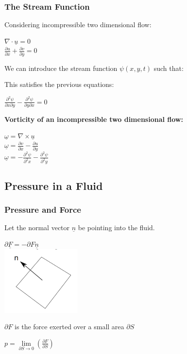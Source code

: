 \subsubsection{The Stream Function}
Considering incompressible two dimensional flow:
\begin{center}
	$\nabla \cdot \underline{u} = 0$
	\\
	$\frac{\partial u}{\partial x} + \frac{\partial v}{\partial y} = 0$	
\end{center}
We can introduce the stream function $\psi (x,y,t)$ such that:
\begin{center}
\end{center}
This satisfies the previous equations:
\begin{center}
	$\frac{\partial^2 \psi}{\partial x \partial y} - \frac{\partial^2 \psi}{\partial y \partial x} = 0$
\end{center}
\textbf{Vorticity of an incompressible two dimensional flow:}
\begin{center}
	$\underline{\omega} = \nabla \times \underline{u}$
	\\
	$\underline{\omega} = \frac{\partial v}{\partial x} - \frac{\partial u}{\partial y}$
	\\
	$\underline{\omega} = -\frac{\partial^2 \psi}{\partial^2 x} - \frac{\partial^2 \psi}{\partial^2 y}$
	\\
	\boxed{\underline{\omega}  = -\nabla^2\psi}
\end{center}

\subsection{Pressure in a Fluid}
\subsubsection{Pressure and Force}
Let the normal vector $\underline{n}$ be pointing into the fluid.
\begin{center}
	$\partial\underline{F} = -\partial F\underline{n}$
	\\
	\includegraphics[width=0.3\textwidth]{Images/Pressure}
\end{center}
$\partial F$ is the force exerted over a small area $\partial S$
\\
\begin{center}
	$p = \lim \limits_{\partial S \to 0}(\frac{\partial F}{\partial S})$
	\\
\end{center}
